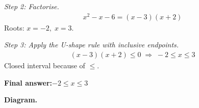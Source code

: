 \documentclass[11pt]{article}
\begin{document}
\textit{Step 2: Factorise.}
\[\begin{gathered}
x^2 - x - 6 = (x - 3)(x + 2)
\end{gathered}\]
Roots: \( x = -2, \; x = 3 \).

\textit{Step 3: Apply the U-shape rule with inclusive endpoints.}
\[\begin{gathered}
(x - 3)(x + 2) \leq 0 \;\Longrightarrow\; -2 \leq x \leq 3
\end{gathered}\]
Closed interval because of \( \leq \).

\begin{answerbox}
\textbf{Final answer:}\quad \(\displaystyle -2 \leq x \leq 3\)
\end{answerbox}
\textbf{Diagram.}

\begin{center}
\end{center}
\end{document}
